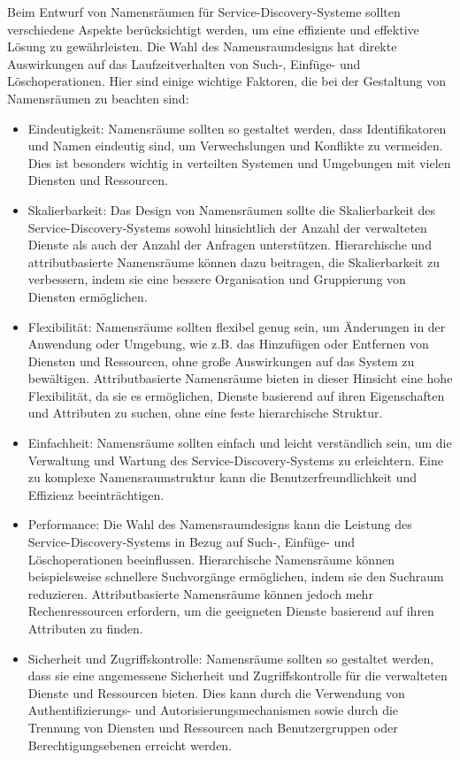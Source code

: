 Beim Entwurf von Namensräumen für Service-Discovery-Systeme sollten verschiedene Aspekte berücksichtigt werden, um eine effiziente und effektive Lösung zu gewährleisten. Die Wahl des Namensraumdesigns hat direkte Auswirkungen auf das Laufzeitverhalten von Such-, Einfüge- und Löschoperationen. Hier sind einige wichtige Faktoren, die bei der Gestaltung von Namensräumen zu beachten sind:
\begin{itemize}
\item Eindeutigkeit: Namensräume sollten so gestaltet werden, dass Identifikatoren und Namen eindeutig sind, um Verwechslungen und Konflikte zu vermeiden. Dies ist besonders wichtig in verteilten Systemen und Umgebungen mit vielen Diensten und Ressourcen.
\item Skalierbarkeit: Das Design von Namensräumen sollte die Skalierbarkeit des Service-Discovery-Systems sowohl hinsichtlich der Anzahl der verwalteten Dienste als auch der Anzahl der Anfragen unterstützen. Hierarchische und attributbasierte Namensräume können dazu beitragen, die Skalierbarkeit zu verbessern, indem sie eine bessere Organisation und Gruppierung von Diensten ermöglichen.
\item Flexibilität: Namensräume sollten flexibel genug sein, um Änderungen in der Anwendung oder Umgebung, wie z.B. das Hinzufügen oder Entfernen von Diensten und Ressourcen, ohne große Auswirkungen auf das System zu bewältigen. Attributbasierte Namensräume bieten in dieser Hinsicht eine hohe Flexibilität, da sie es ermöglichen, Dienste basierend auf ihren Eigenschaften und Attributen zu suchen, ohne eine feste hierarchische Struktur.
\item Einfachheit: Namensräume sollten einfach und leicht verständlich sein, um die Verwaltung und Wartung des Service-Discovery-Systems zu erleichtern. Eine zu komplexe Namensraumstruktur kann die Benutzerfreundlichkeit und Effizienz beeinträchtigen.
\item Performance: Die Wahl des Namensraumdesigns kann die Leistung des Service-Discovery-Systems in Bezug auf Such-, Einfüge- und Löschoperationen beeinflussen. Hierarchische Namensräume können beispielsweise schnellere Suchvorgänge ermöglichen, indem sie den Suchraum reduzieren. Attributbasierte Namensräume können jedoch mehr Rechenressourcen erfordern, um die geeigneten Dienste basierend auf ihren Attributen zu finden.
\item Sicherheit und Zugriffskontrolle: Namensräume sollten so gestaltet werden, dass sie eine angemessene Sicherheit und Zugriffskontrolle für die verwalteten Dienste und Ressourcen bieten. Dies kann durch die Verwendung von Authentifizierungs- und Autorisierungsmechanismen sowie durch die Trennung von Diensten und Ressourcen nach Benutzergruppen oder Berechtigungsebenen erreicht werden.
\end{itemize}

